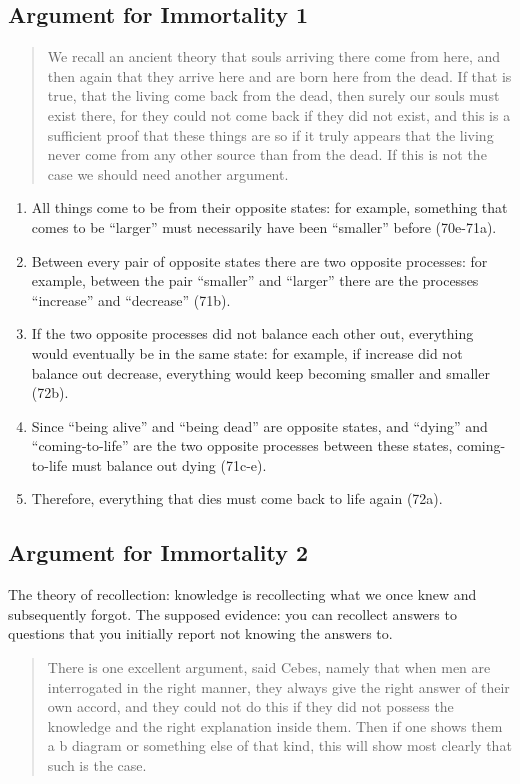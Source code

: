\documentclass[oneside]{article}
\begin{document}
\subsection*{Argument for Immortality 1}
\begin{quote}
We recall an ancient theory that souls arriving there come from here, and then again that they arrive here and are born here from the dead. If that is true, that the living come back from the dead, then surely our souls must exist there, for they could not come back if they did not exist, and this is a sufficient proof that these things are so if it truly appears that the living never come from any other source than from the dead. If this is not the case we should need another argument.
\end{quote}
\begin{enumerate}
\item
  All things come to be from their opposite states: for example,
  something that comes to be ``larger'' must necessarily have been
  ``smaller'' before (70e-71a).
\item
  Between every pair of opposite states there are two opposite
  processes: for example, between the pair ``smaller'' and ``larger''
  there are the processes ``increase'' and ``decrease'' (71b).
\item
  If the two opposite processes did not balance each other out,
  everything would eventually be in the same state: for example, if
  increase did not balance out decrease, everything would keep becoming
  smaller and smaller (72b).
\item
  Since ``being alive'' and ``being dead'' are opposite states, and
  ``dying'' and ``coming-to-life'' are the two opposite processes
  between these states, coming-to-life must balance out dying (71c-e).
\item
  Therefore, everything that dies must come back to life again (72a).
\end{enumerate}

\subsection*{Argument for Immortality 2}


The theory of recollection: knowledge is recollecting what we once knew and subsequently forgot. The supposed evidence: you can recollect answers to questions that you initially report not knowing the answers to. 
\begin{quote}
There is one excellent argument, said Cebes, namely that when men are interrogated in the right manner, they always give the right answer of their own accord, and they could not do this if they did not possess the knowledge and the right explanation inside them. Then if one shows them a b diagram or something else of that kind, this will show most clearly that such is the case.
\end{quote}
\end{document}
